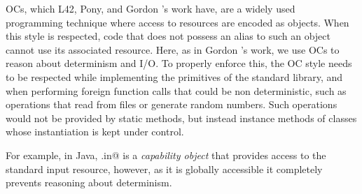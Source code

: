 


OCs, which L42, Pony, and Gordon \etal's work have, are a widely used~\cite{miller2003capability,
noble2016abstract,karger1988improving} programming technique where access to resources are encoded as objects. When this style
is respected, code that does not possess an alias to such an object cannot use its associated resource.
Here, as in Gordon \etal's work, we use OCs to reason about determinism and I/O. To properly enforce this, the OC style needs to be respected while implementing the primitives of the standard library, and when performing foreign function calls that could be non deterministic, such as operations that read from files or generate random numbers. Such operations would not be provided by static methods, but instead instance methods of classes whose instantiation is kept under control. 




\lstset{language=Java}
 For example, in Java, \Q@System.in@
 \lstset{language=FortyTwo} 
  is a \emph{capability object} that provides access to the standard input resource, however, as it is globally accessible it completely prevents reasoning about determinism. 


